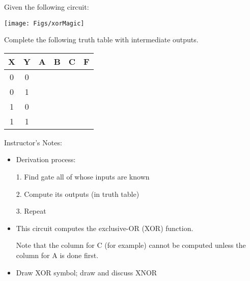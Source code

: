 \begin{frame}[fragile]
\begin{tcolorbox}[enhanced,attach boxed title to top center={yshift=-3mm,yshifttext=-1mm},
  colback=red!5!white,colframe=red!75!black,colbacktitle=red!80!black,
  title=Try this,fonttitle=\bfseries,
  boxed title style={size=small,colframe=red!50!black} ]
  Given the following circuit:
  \begin{center}
      \texttt{[image: Figs/xorMagic]}
  \end{center}
  
  Complete the following truth table with intermediate outputs.
  \begin{center}\small
	\begin{tabular}{cc|ccc|c}
		X & Y & A & B & C & F\\
		\hline
		0 & 0 &&&&\\
		0 & 1 &&&&\\
		1 & 0 &&&&\\
		1 & 1 &&&&
	\end{tabular}
	\end{center}
\end{tcolorbox}

\end{frame}
\BNotes\ifnum{}
\begin{frame}[fragile]
Instructor's Notes:
\begin{itemize}
\item Derivation process:

	1. Find gate all of whose inputs are known

	2. Compute its outputs (in truth table)

	3. Repeat
\item This circuit computes the exclusive-OR (XOR) function. 

	Note that the column for C (for example)
	cannot be computed unless the column for A is done first.
\item Draw XOR symbol; draw and discuss XNOR
\end{itemize}
\end{frame}
\fi\ENotes


